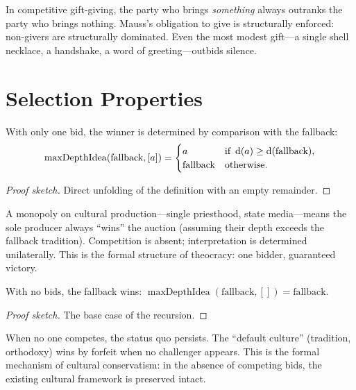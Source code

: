In competitive gift-giving, the party who brings \emph{something} always
outranks the party who brings nothing.  Mauss's obligation to give is
structurally enforced: non-givers are structurally dominated.  Even the
most modest gift---a single shell necklace, a handshake, a word of
greeting---outbids silence.

\section{Selection Properties}
\label{sec:ch14-selection}

\begin{theorem}
\label{thm:single-bidder}
With only one bid, the winner is determined by comparison with the fallback:
\[
  \operatorname{maxDepthIdea}(\text{fallback}, [a]) =
  \begin{cases}
    a & \text{if } \operatorname{d}(a) \ge \operatorname{d}(\text{fallback}), \\
    \text{fallback} & \text{otherwise}.
  \end{cases}
\]
\end{theorem}

\begin{proof}[Proof sketch]
Direct unfolding of the definition with an empty remainder.
\end{proof}

A monopoly on cultural production---single priesthood, state media---means
the sole producer always ``wins'' the auction (assuming their depth exceeds
the fallback tradition).  Competition is absent; interpretation is
determined unilaterally.  This is the formal structure of theocracy:
one bidder, guaranteed victory.

\begin{theorem}
\label{thm:empty-auction}
With no bids, the fallback wins:
$\operatorname{maxDepthIdea}(\text{fallback}, []) = \text{fallback}$.
\end{theorem}

\begin{proof}[Proof sketch]
The base case of the recursion.
\end{proof}

When no one competes, the status quo persists.  The ``default culture''
(tradition, orthodoxy) wins by forfeit when no challenger appears.  This
is the formal mechanism of cultural conservatism: in the absence of
competing bids, the existing cultural framework is preserved intact.

